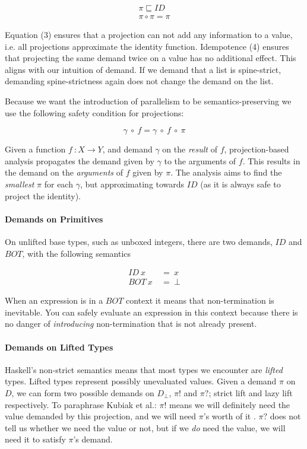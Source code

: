 \begin{align}
\pi \sqsubseteq ID \\
\pi \circ \pi = \pi
\end{align}

Equation (3) ensures that a projection can not add any information to a value,
i.e. all projections approximate the identity function. Idempotence (4) ensures
that projecting the same demand twice on a value has no additional effect. This
aligns with our intuition of demand. If we demand that a list is spine-strict,
demanding spine-strictness again does not change the demand on the list.

Because we want the introduction of parallelism to be semantics-preserving we
use the following safety condition for projections:

\begin{equation}
\gamma \ \circ \ f = \gamma \ \circ \ f \ \circ \ \pi
\end{equation}

Given a function $f \ : X \rightarrow Y$, and demand $\gamma$ on the
\emph{result} of $f$, projection-based analysis propagates the demand given by
$\gamma$ to the arguments of $f$. This results in the demand on the
\emph{arguments} of $f$ given by $\pi$.  The analysis aims to find the
\emph{smallest} $\pi$ for each $\gamma$, but approximating towards $ID$ (as
it is always safe to project the identity).

\paragraph{Demands on Primitives}
On unlifted base types, such as unboxed integers, there are two demands,
$ID$ and $BOT$, with the following semantics


\begin{align}
ID \ x \ &= \ x \\
BOT \ x \ &= \ \bot
\end{align}


When an expression is in a $BOT$ context it means that non-termination is
inevitable. You can safely evaluate an expression in this context because there
is no danger of \emph{introducing} non-termination that is not already present.

\paragraph{Demands on Lifted Types} Haskell's non-strict semantics means that
most types we encounter are \emph{lifted} types.  Lifted types represent
possibly unevaluated values. Given a demand $\pi$ on $D$, we can form two
possible demands on $D_{\bot}$, $\pi!$ and $\pi?$; strict lift and lazy lift
respectively. To paraphrase Kubiak et al.: $\pi!$ means we will definitely need
the value demanded by this projection, and we will need $\pi$'s worth of it
\citep{kubiak}. $\pi?$ does not tell us whether we need the value or not, but if
we \emph{do} need the value, we will need it to satisfy $\pi$'s demand.

